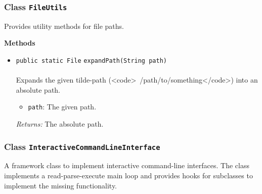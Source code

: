 \subsubsection{Class \lstinline|FileUtils|}
Provides utility methods for file paths. \\
\noindent\begin{minipage}[t]{5cm}
\vspace{0.3em}
\hspace*{2em}
\vspace{0.3em}
\end{minipage}





\textbf{\sffamily Methods}
\begin{itemize}
\item \lstinline|public static File| \lstinline|expandPath|\lstinline|(String path)|\\ \\[-0.6em]
Expands the given tilde-path (<code>~/path/to/something</code>) into an absolute path.
\begin{itemize}
\item \lstinline|path|: The given path.
\end{itemize}

\emph{Returns:} The absolute path.

\end{itemize}

\subsubsection{Class \lstinline|InteractiveCommandLineInterface|}
A framework class to implement interactive command-line interfaces. The class implements
 a read-parse-execute main loop and provides hooks for subclasses to implement the missing
 functionality. \\
\noindent\begin{minipage}[t]{5cm}
\vspace{0.3em}
\hspace*{2em}
\vspace{0.3em}
\end{minipage}



